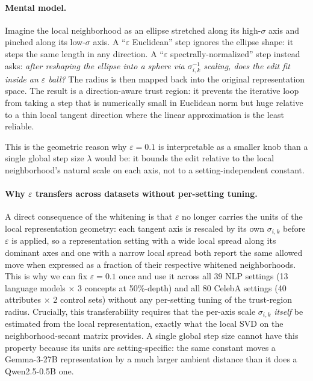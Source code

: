 \paragraph{Mental model.}
Imagine the local neighborhood as an ellipse stretched along its high-$\sigma$ axis and pinched along its low-$\sigma$ axis. A ``$\varepsilon$ Euclidean'' step ignores the ellipse shape: it steps the same length in any direction. A ``$\varepsilon$ spectrally-normalized'' step instead asks: \emph{after reshaping the ellipse into a sphere via $\sigma_{i,k}^{-1}$ scaling, does the edit fit inside an $\varepsilon$ ball?} The radius is then mapped back into the original representation space. The result is a direction-aware trust region: it prevents the iterative loop from taking a step that is numerically small in Euclidean norm but huge relative to a thin local tangent direction where the linear approximation is the least reliable.

This is the geometric reason why $\varepsilon = 0.1$ is interpretable as a smaller knob than a single global step size $\lambda$ would be: it bounds the edit relative to the local neighborhood's natural scale on each axis, not to a setting-independent constant.

\paragraph{Why $\varepsilon$ transfers across datasets without per-setting tuning.}
A direct consequence of the whitening is that $\varepsilon$ no longer carries the units of the local representation geometry: each tangent axis is rescaled by its own $\sigma_{i,k}$ before $\varepsilon$ is applied, so a representation setting with a wide local spread along its dominant axes and one with a narrow local spread both report the same allowed move when expressed as a fraction of their respective whitened neighborhoods. This is why we can fix $\varepsilon = 0.1$ once and use it across all 39 NLP settings (13 language models $\times$ 3 concepts at 50\%-depth) and all 80 CelebA settings (40 attributes $\times$ 2 control sets) without any per-setting tuning of the trust-region radius. Crucially, this transferability requires that the per-axis scale $\sigma_{i,k}$ \emph{itself} be estimated from the local representation, exactly what the local SVD on the neighborhood-secant matrix provides. A single global step size cannot have this property because its units are setting-specific: the same constant moves a Gemma-3-27B representation by a much larger ambient distance than it does a Qwen2.5-0.5B one.

